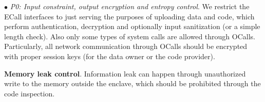 \vspace{2pt}\noindent$\bullet$\textit{ P0: Input constraint, output encryption and entropy control}.
We restrict the ECall interfaces to just serving the purposes of uploading data and code, which perform authentication, decryption and optionally input sanitization (or a simple length check). Also only some types of system calls are allowed through OCalls. Particularly, all network communication through OCalls should be encrypted with proper session keys (for the data owner or the code provider).
\DIFdelbegin {}\DIFdelend 


\vspace{3pt}\noindent\textbf{Memory leak control}. Information leak can happen through unauthorized write to the memory outside the enclave, which should be prohibited through the code inspection. 


